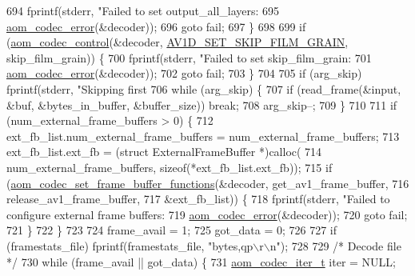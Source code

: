 \begin{DoxyCodeInclude}
{{{{{{{{{{{{{{{{{{{{{{{{{{{{{{{{{{{694     fprintf(stderr, \textcolor{stringliteral}{"Failed to set output\_all\_layers: %
695             \hyperlink{group__codec_ga50949c0854605c722832bbfb0803f5f4}{aom\_codec\_error}(&decoder));
696     \textcolor{keywordflow}{goto} fail;
697   \}
698 
699   \textcolor{keywordflow}{if} (\hyperlink{group__codec_ga6da974f4eeaba1fa74106b28d0fe6ac5}{aom\_codec\_control}(&decoder, \hyperlink{group__aom__decoder_gga3865fd4b3192489baa9a5c3632ebe97ba17fa09c9ce1ae4a68eae21efd219418b}{AV1D\_SET\_SKIP\_FILM\_GRAIN}, 
      skip\_film\_grain)) \{
700     fprintf(stderr, \textcolor{stringliteral}{"Failed to set skip\_film\_grain: %
701             \hyperlink{group__codec_ga50949c0854605c722832bbfb0803f5f4}{aom\_codec\_error}(&decoder));
702     \textcolor{keywordflow}{goto} fail;
703   \}
704 
705   \textcolor{keywordflow}{if} (arg\_skip) fprintf(stderr, \textcolor{stringliteral}{"Skipping first %
706   \textcolor{keywordflow}{while} (arg\_skip) \{
707     \textcolor{keywordflow}{if} (read\_frame(&input, &buf, &bytes\_in\_buffer, &buffer\_size)) \textcolor{keywordflow}{break};
708     arg\_skip--;
709   \}
710 
711   \textcolor{keywordflow}{if} (num\_external\_frame\_buffers > 0) \{
712     ext\_fb\_list.num\_external\_frame\_buffers = num\_external\_frame\_buffers;
713     ext\_fb\_list.ext\_fb = (\textcolor{keyword}{struct }ExternalFrameBuffer *)calloc(
714         num\_external\_frame\_buffers, \textcolor{keyword}{sizeof}(*ext\_fb\_list.ext\_fb));
715     \textcolor{keywordflow}{if} (\hyperlink{group__cap__external__frame__buffer_ga1818a812e4d1e70eeafbe5b0ee538d6e}{aom\_codec\_set\_frame\_buffer\_functions}(&decoder, 
      get\_av1\_frame\_buffer,
716                                              release\_av1\_frame\_buffer,
717                                              &ext\_fb\_list)) \{
718       fprintf(stderr, \textcolor{stringliteral}{"Failed to configure external frame buffers: %
719               \hyperlink{group__codec_ga50949c0854605c722832bbfb0803f5f4}{aom\_codec\_error}(&decoder));
720       \textcolor{keywordflow}{goto} fail;
721     \}
722   \}
723 
724   frame\_avail = 1;
725   got\_data = 0;
726 
727   \textcolor{keywordflow}{if} (framestats\_file) fprintf(framestats\_file, \textcolor{stringliteral}{"bytes,qp\(\backslash\)r\(\backslash\)n"});
728 
729   \textcolor{comment}{/* Decode file */}
730   \textcolor{keywordflow}{while} (frame\_avail || got\_data) \{
731     \hyperlink{group__codec_gadf9e173c9e02788a9999399edab20a02}{aom\_codec\_iter\_t} iter = NULL;
}}}}}}}}}}}}}}}}}}}}}}}}}}}}}}}}}}}}}}}
\end{DoxyCodeInclude}
